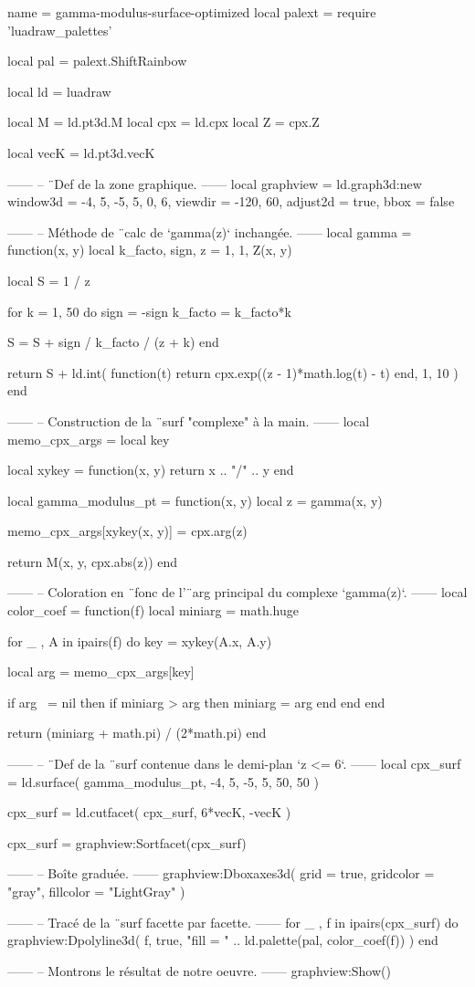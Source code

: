 \documentclass[border = 3pt]{standalone}
\begin{document}
\begin{luadraw*}{name = gamma-modulus-surface-optimized}
local palext = require 'luadraw_palettes'

local pal = palext.ShiftRainbow

local ld = luadraw

local M   = ld.pt3d.M
local cpx = ld.cpx
local Z   = cpx.Z

local vecK = ld.pt3d.vecK

------
-- ¨Def de la zone graphique.
------
local graphview = ld.graph3d:new{
  window3d = {-4, 5, -5, 5, 0, 6},
  viewdir  = {-120, 60},
  adjust2d = true,
  bbox     = false
}

------
-- Méthode de ¨calc de `gamma(z)` inchangée.
------
local gamma = function(x, y)
  local k_facto, sign, z = 1, 1, Z(x, y)

  local S = 1 / z

  for k = 1, 50 do
    sign    = -sign
    k_facto = k_facto*k

    S = S + sign / k_facto / (z + k)
  end

  return S + ld.int(
    function(t)
      return cpx.exp((z - 1)*math.log(t) - t)
    end,
    1, 10
  )
end

------
-- Construction de la ¨surf "complexe" à la main.
------
local memo_cpx_args = {}
local key

local xykey = function(x, y)
    return x .. "/" .. y
end

local gamma_modulus_pt = function(x, y)
  local z = gamma(x, y)

  memo_cpx_args[xykey(x, y)] = cpx.arg(z)

  return M(x, y, cpx.abs(z))
end

------
-- Coloration en ¨fonc de l'¨arg principal du complexe `gamma(z)`.
------
local color_coef = function(f)
  local miniarg = math.huge

  for _ , A in ipairs(f) do
    key = xykey(A.x, A.y)

    local arg = memo_cpx_args[key]

    if arg ~= nil then
      if miniarg > arg then
        miniarg = arg
      end
    end
  end

  return (miniarg + math.pi) / (2*math.pi)
end

------
-- ¨Def de la ¨surf contenue dans le demi-plan `z <= 6`.
------
local cpx_surf = ld.surface(
  gamma_modulus_pt,
  -4, 5, -5, 5,
  {50, 50}
)

cpx_surf = ld.cutfacet(
  cpx_surf,
  {6*vecK, -vecK}
)

cpx_surf = graphview:Sortfacet(cpx_surf)

------
-- Boîte graduée.
------
graphview:Dboxaxes3d({
  grid      = true,
  gridcolor = "gray",
  fillcolor = "LightGray"
})

------
-- Tracé de la ¨surf facette par facette.
------
for _ , f in ipairs(cpx_surf) do
  graphview:Dpolyline3d(
    f,
    true,
       "fill = "
    .. ld.palette(pal, color_coef(f))
  )
end

------
-- Montrons le résultat de notre oeuvre.
------
graphview:Show()
\end{luadraw*}
\end{document}

